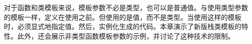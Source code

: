 对于函数和类模板来说，模板参数不必是类型，也可以是普通值。与使用类型参数的模板一样，定义在使用之前。但使用的是值，而不是类型。当使用这样的模板时，必须显式地指定值。然后，实例化生成的代码。本章演示了新版栈类模板的特性。此外，还会展示非类型函数模板参数的示例，并讨论了这种技术的限制。